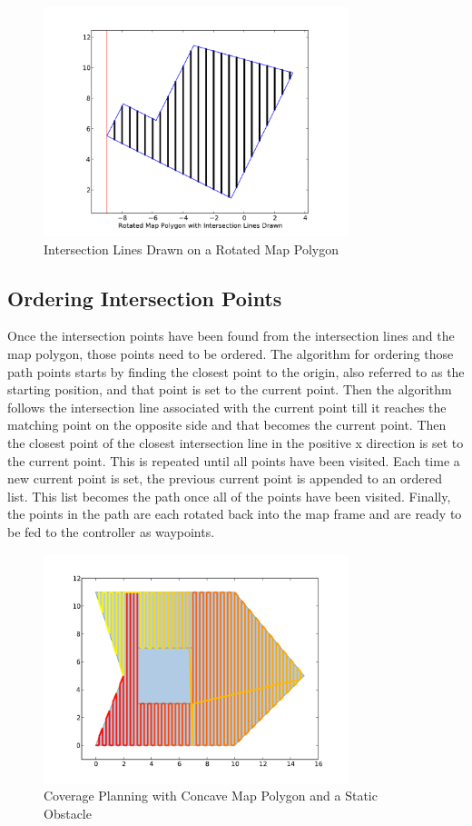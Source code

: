 \documentclass[journal]{IEEEtran}
\begin{document}
  \begin{figure}[here]
    \centering
    \includegraphics[width=3.5in,keepaspectratio]{intersection.pdf}
    \caption{Intersection Lines Drawn on a Rotated Map Polygon}
    \label{fig:intersections}
  \end{figure}
  
  \subsection{Ordering Intersection Points}
  Once the intersection points have been found from the intersection lines and the map polygon, those points need to be ordered.  The algorithm for ordering those path points starts by finding the closest point to the origin, also referred to as the starting position, and that point is set to the current point.  Then the algorithm follows the intersection line associated with the current point till it reaches the matching point on the opposite side and that becomes the current point.  Then the closest point of the closest intersection line in the positive x direction is set to the current point.  This is repeated until all points have been visited.  Each time a new current point is set, the previous current point is appended to an ordered list.  This list becomes the path once all of the points have been visited.  Finally, the points in the path are each rotated back into the map frame and are ready to be fed to the controller as waypoints.
  
  \begin{figure}[here]
    \centering
    \includegraphics[width=3.5in,keepaspectratio]{obstacle.pdf}
    \caption{Coverage Planning with Concave Map Polygon and a Static Obstacle}
    \label{fig:obstacle}
  \end{figure}
  
\end{document}
